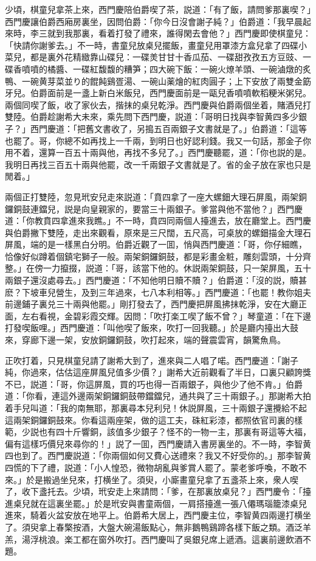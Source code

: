 少頃，棋童兒拿茶上來，西門慶陪伯爵喫了茶，説道：「有了飯，請問爹那裏喫？」西門慶讓伯爵西廂房裏坐，因問伯爵：「你今日沒會謝子純？」伯爵道：「我早晨起來時，李三就到我那裏，看着打發了禮來，誰得閑去會他？」西門慶即使棋童兒：「快請你謝爹去。」不一時，書童兒放桌兒擺飯，畫童兒用罩漆方盒兒拿了四碟小菜兒，都是裏外花精緻靠山碟兒：一碟羙甘甘十香瓜茄、一碟甜孜孜五方豆豉、一碟香噴噴的橘醬、一碟紅馥馥的糟笋；四大碗下飯：一碗火燎羊頭、一碗滷燉的炙鴨、一碗黄芽菜並り的餛飩鷄疍湯、一碗山薬燴的紅肉圓子；上下安放了兩雙金筯牙兒。伯爵面前是一盞上新白米飯兒，西門慶面前是一甌兒香噴噴軟稻粳米粥兒。兩個同喫了飯，收了家伙去，揩抹的桌兒乾淨。西門慶與伯爵兩個坐着，賭酒兒打雙陸。伯爵趁謝希大未來，乘先問下西門慶，説道：「哥明日找與李智黄四多少銀子？」西門慶道：「把舊文書收了，另搗五百兩銀子文書就是了。」伯爵道：「這等也罷了。哥，你總不如再找上一千兩，到明日也好認利錢。我又一句話，那金子你用不着，還算一百五十兩與他，再找不多兒了。」西門慶聽罷，道：「你也説的是。我明日再找三百五十兩與他罷，改一千兩銀子文書就是了。省的金子放在家也只是閒着。」

兩個正打雙陸，忽見玳安兒走來説道：「賁四拿了一座大螺鈿大理石屏風，兩架銅鑼銅鼓連鐺兒，説是向皇親家的，要當三十兩銀子。爹當與他不當他？」西門慶道：「你教賁四拿進來我瞧。」不一時，賁四同兩個人擡進去，放在廳堂上。西門慶與伯爵撇下雙陸，走出來觀看，原來是三尺闊，五尺高，可桌放的螺鈿描金大理石屏風，端的是一樣黑白分明。伯爵近觀了一囬，悄與西門慶道：「哥，你仔細瞧，恰像好似蹲着個鎮宅獅子一般。兩架銅鑼銅鼓，都是彩畫金粧，雕刻雲頭，十分齊整。」在傍一力攛掇，説道：「哥，該當下他的。休説兩架銅鼓，只一架屏風，五十兩銀子還沒處尋去。」西門慶道：「不知他明日贖不贖？」伯爵道：「沒的説，贖甚麽？下坡車兒營生，及到三年過來，七八本利相等。」西門慶道：「也罷！教你姐夫前邊鋪子裏兑三十兩與他罷。」剛打發去了，西門慶把屏風拂抹乾淨，安在大廳正面，左右看視，金碧彩霞交輝。因問：「吹打楽工喫了飯不曾？」琴童道：「在下邊打發喫飯哩。」西門慶道：「叫他喫了飯來，吹打一回我聽。」於是廳内擡出大鼓來，穿廊下邊一架，安放銅鑼銅鼓，吹打起來，端的聲震雲宵，韻驚魚鳥。

正吹打着，只見棋童兒請了謝希大到了，進來與二人唱了喏。西門慶道：「謝子純，你過來，估估這座屏風兒值多少價？」謝希大近前觀看了半日，口裏只顧誇獎不已，説道：「哥，你這屏風，買的巧也得一百兩銀子，與他少了他不肯。」伯爵道：「你看，連這外邊兩架銅鑼銅鼓帶鐺鐺兒，通共與了三十兩銀子。」那謝希大拍着手兒叫道：「我的南無耶，那裏尋本兒利兒！休説屏風，三十兩銀子還攪給不起這兩架銅鑼銅鼓來。你看這兩座架，做的這工夫，硃紅彩漆，都照依官司裏的樣範，少説也有四十斤響銅，該值多少銀子？怪不的一物一主，那裏有哥這等大福，偏有這樣巧價兒來尋你的！」説了一囬，西門慶請入書房裏坐的。不一時，李智黄四也到了。西門慶説道：「你兩個如何又費心送禮來？我又不好受你的。」那李智黄四慌的下了禮，説道：「小人惶恐，微物胡亂與爹賞人罷了。蒙老爹呼喚，不敢不來。」於是搬過坐兒來，打横坐了。須臾，小廝畫童兒拿了五盞茶上來，衆人喫了，收下盞托去。少頃，玳安走上來請問：「爹，在那裏放桌兒？」西門慶令：「擡進桌兒就在這裏坐罷。」於是玳安與書童兩個，一肩搭擡進一張八僊瑪瑙籠漆桌兒進來，騎着火盆安放在地平上。伯爵希大居上，西門慶主位，李智黄四兩邊打横坐了。須臾拿上春檠按酒，大盤大碗湯飯點心，無非鵝鴨鷄蹄各樣下飯之類。酒泛羊羔，湯浮桃浪。楽工都在窗外吹打。西門慶叫了吳銀兒席上遞酒。這裏前邊飲酒不題。

